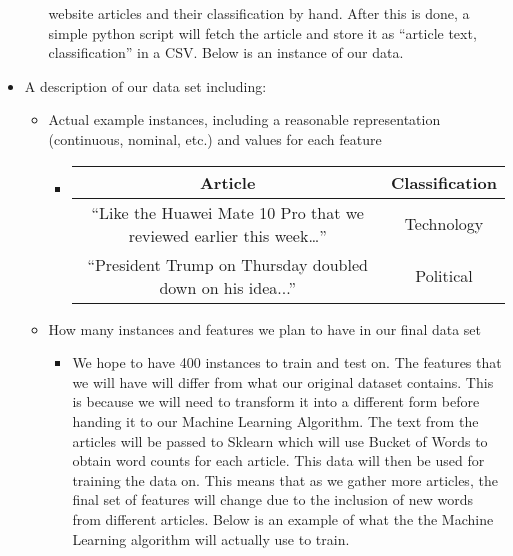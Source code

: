\documentclass[fleqn,11pt]{article}
\begin{document}
\begin{itemize}
\begin{itemize}
        website articles and their classification by hand. After this is done,  a simple python script 
        will fetch the article and store it as “article text, classification” in a CSV. Below is an 
        instance of our data.
      \end{itemize}
    \item A description of our data set including:
      \begin{itemize}
        \item Actual example instances, including a reasonable representation (continuous, nominal, etc.) and values for each feature
          \begin{itemize}
            \item
            \begin{tabular}{|cc|}
              \hline
              Article                                                           & Classification\\
              \hline
              “Like the Huawei Mate 10 Pro that we reviewed earlier this week…” & Technology\\
              “President Trump on Thursday doubled down on his idea...”         & Political\\
              \hline
            \end{tabular}
          \end{itemize}
        \item How many instances and features we plan to have in our final data set
          \begin{itemize}
            \item 
            We hope to have 400 instances to train and test on. The features that we will have will 
            differ from what our original dataset contains. This is because we will need to transform it 
            into a different form before handing it to our Machine Learning Algorithm. The text from the 
            articles will be passed to Sklearn which will use Bucket of Words to obtain word counts for 
            each article. This data will then be used for training the data on. This means that as we 
            gather more articles, the final set of features will change due to the inclusion of new 
            words from different articles. Below is an example of what the the Machine Learning algorithm 
            will actually use to train.
      
            \medskip
            \medskip
            

\end{itemize}
\end{itemize}
\end{itemize}
\end{document}
